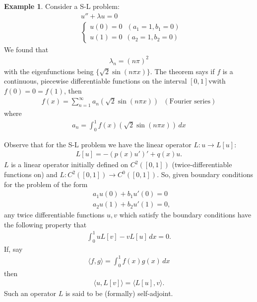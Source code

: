 \documentclass{book}
\theoremstyle{definition}
\newtheorem{exmp}{Example}[section]
\begin{document}
\begin{exmp}
	Consider a S-L problem:
	\begin{align*}
	&u'' + \lambda u = 0\\
	&\begin{cases}
	u(0)=0\,\,\,\, (a_1=1,b_1=0)\\
	u(1) = 0\,\,\, (a_2=1, b_2=0)
	\end{cases}
	\end{align*}
	We found that
	\begin{align*}
	\lambda_n = (n\pi)^2
	\end{align*}
	with the eigenfunctions being $\{\sqrt{2} \sin(n\pi x) \}$. The theorem says if $f$ is a continuous, piecewise differentiable functions on the interval $[0,1]$vwith $f(0) = 0 = f(1)$, then 
	\begin{align*}
	f(x) = \sum^\infty_{n=1}a_n\left(\sqrt{2}\sin(n\pi x)\right)\,\,\,\, (\text{Fourier series})
	\end{align*}
	where 
	\begin{align*}
	a_n = \int^1_0 f(x)\left(\sqrt{2}\sin(n\pi x) \right)\,dx
	\end{align*}
\end{exmp}

Observe that for the S-L problem we have the linear operator $L : u \to L[u]$:
\begin{align*}
L[u] = -(p(x)u')' + q(x)u.
\end{align*}
$L$ is a linear operator initially defined on $C^2([0,1])$ (twice-differentiable functions on) and $L : C^2([0,1])\to C^0([0,1])$. So, given boundary conditions for the problem of the form 
\begin{align*}
&a_1u(0) + b_1u'(0) = 0\\
&a_2u(1) + b_2u'(1) = 0,
\end{align*}
any twice differentiable functions $u,v$ which satisfy the boundary conditions have the following property that 
\begin{align*}
\int^1_0 uL[v] - vL[u]\,dx = 0.
\end{align*}
If, say
\begin{align*}
\langle f,g \rangle = \int^1_0 f(x)g(x)\,dx
\end{align*}
then 
\begin{align*}
\langle u,L[v]\rangle = \langle L[u],v\rangle.
\end{align*}
Such an operator $L$ is said to be (formally) self-adjoint. 
\end{document}

